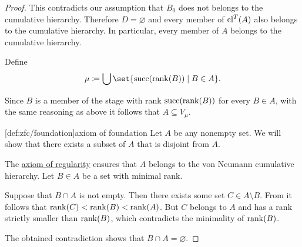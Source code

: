 \begin{proof}
  This contradicts our assumption that \( B_0 \) does not belongs to the cumulative hierarchy. Therefore \( D = \varnothing \) and every member of \( \operatorname{cl}^T(A) \) also belongs to the cumulative hierarchy. In particular, every member of \( A \) belongs to the cumulative hierarchy.

  Define
  \begin{equation*}
    \mu \coloneqq \bigcup\set{ \op{succ}(\rank(B)) \given B \in A }.
  \end{equation*}

  Since \( B \) is a member of the stage with rank \( \operatorname{succ}(\operatorname{rank}(B)) \) for every \( B \in A \), with the same reasoning as above it follows that \( A \subseteq V_\mu \).

  [def:zfc/foundation]{axiom of foundation} Let \( A \) be any nonempty set. We will show that there exists a subset of \( A \) that is disjoint from \( A \).

  The \hyperref[def:axiom_of_regularity]{axiom of regularity} ensures that \( A \) belongs to the von Neumann cumulative hierarchy. Let \( B \in A \) be a set with minimal rank.

  Suppose that \( B \cap A \) is not empty. Then there exists some set \( C \in A \setminus B \). From  it follows that \( \operatorname{rank}(C) < \operatorname{rank}(B) < \operatorname{rank}(A) \). But \( C \) belongs to \( A \) and has a rank strictly smaller than \( \operatorname{rank}(B) \), which contradicts the minimality of \( \operatorname{rank}(B) \).

  The obtained contradiction shows that \( B \cap A = \varnothing \).
\end{proof}

